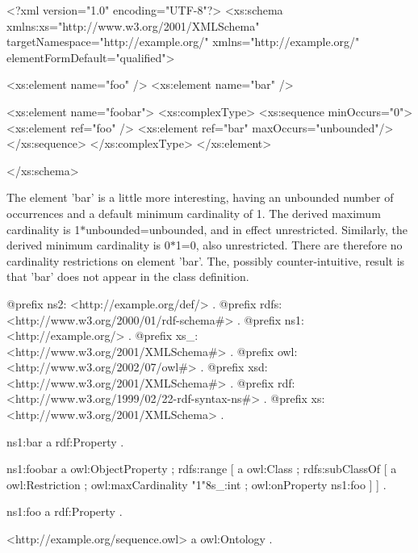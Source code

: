 \begin{DoxyCodeInclude}
<?xml version="1.0" encoding="UTF-8"?>
<xs:schema xmlns:xs="http://www.w3.org/2001/XMLSchema"
        targetNamespace="http://example.org/" xmlns="http://example.org/"
        elementFormDefault="qualified">
        
        <xs:element name="foo" />
        <xs:element name="bar" />
        
        <xs:element name="foobar">
                <xs:complexType>
                        <xs:sequence minOccurs="0">
                                <xs:element ref="foo" />
                                <xs:element ref="bar" maxOccurs="unbounded"/>
                        </xs:sequence>
                </xs:complexType>
        </xs:element>
        
</xs:schema>
\end{DoxyCodeInclude}


The element 'bar' is a little more interesting, having an unbounded number of occurrences and a default minimum cardinality of 1. The derived maximum cardinality is 1$\ast$unbounded=unbounded, and in effect unrestricted. Similarly, the derived minimum cardinality is 0$\ast$1=0, also unrestricted. There are therefore no cardinality restrictions on element 'bar'. The, possibly counter-\/intuitive, result is that 'bar' does not appear in the class definition.


\begin{DoxyCodeInclude}
@prefix ns2:     <http://example.org/def/> .
@prefix rdfs:    <http://www.w3.org/2000/01/rdf-schema#> .
@prefix ns1:     <http://example.org/> .
@prefix xs_:     <http://www.w3.org/2001/XMLSchema#> .
@prefix owl:     <http://www.w3.org/2002/07/owl#> .
@prefix xsd:     <http://www.w3.org/2001/XMLSchema#> .
@prefix rdf:     <http://www.w3.org/1999/02/22-rdf-syntax-ns#> .
@prefix xs:      <http://www.w3.org/2001/XMLSchema> .

ns1:bar
      a       rdf:Property .

ns1:foobar
      a       owl:ObjectProperty ;
      rdfs:range
              [ a       owl:Class ;
                rdfs:subClassOf
                        [ a       owl:Restriction ;
                          owl:maxCardinality "1"^^xs_:int ;
                          owl:onProperty ns1:foo
                        ]
              ] .

ns1:foo
      a       rdf:Property .

<http://example.org/sequence.owl>
      a       owl:Ontology .
\end{DoxyCodeInclude}


